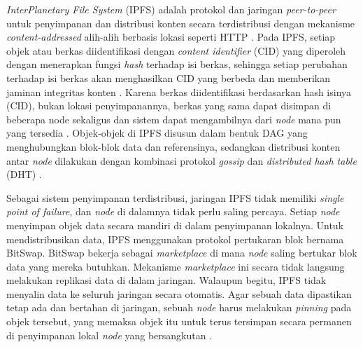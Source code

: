 \textit{InterPlanetary File System} (IPFS) adalah protokol dan jaringan \textit{peer-to-peer} untuk penyimpanan dan distribusi konten secara terdistribusi dengan mekanisme \textit{content-addressed} alih-alih berbasis lokasi seperti HTTP \parencite{Benet_2014_ipfs}.
Pada IPFS, setiap objek atau berkas diidentifikasi dengan \textit{content identifier} (CID) yang diperoleh dengan menerapkan fungsi \textit{hash} terhadap isi berkas, sehingga setiap perubahan terhadap isi berkas akan menghasilkan CID yang berbeda dan memberikan jaminan integritas konten \parencite{Benet_2014_ipfs}.
Karena berkas diidentifikasi berdasarkan hash isinya (CID), bukan lokasi penyimpanannya, berkas yang sama dapat disimpan di beberapa node sekaligus dan sistem dapat mengambilnya dari \textit{node} mana pun yang tersedia \parencite{Benet_2014_ipfs}.
Objek-objek di IPFS disusun dalam bentuk DAG yang menghubungkan blok-blok data dan referensinya, sedangkan distribusi konten antar \textit{node} dilakukan dengan kombinasi protokol \textit{gossip} dan \textit{distributed hash table} (DHT) \parencite{Benet_2014_ipfs}.

Sebagai sistem penyimpanan terdistribusi, jaringan IPFS tidak memiliki \textit{single point of failure}, dan \textit{node} di dalamnya tidak perlu saling percaya. 
Setiap \textit{node} menyimpan objek data secara mandiri di dalam penyimpanan lokalnya. 
Untuk mendistribusikan data, IPFS menggunakan protokol pertukaran blok bernama BitSwap. 
BitSwap bekerja sebagai \textit{marketplace} di mana \textit{node} saling bertukar blok data yang mereka butuhkan. 
Mekanisme \textit{marketplace} ini secara tidak langsung melakukan replikasi data di dalam jaringan. 
Walaupun begitu, IPFS tidak menyalin data ke seluruh jaringan secara otomatis. 
Agar sebuah data dipastikan tetap ada dan bertahan di jaringan, sebuah \textit{node} harus melakukan \textit{pinning} pada objek tersebut, yang memaksa objek itu untuk terus tersimpan secara permanen di penyimpanan lokal \textit{node} yang bersangkutan \parencite{Benet_2014_ipfs}.
